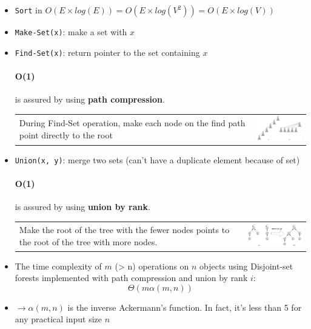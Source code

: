\begin{itemize}
    \item \texttt{Sort} in $O(E \times log(E)) = O(E \times log(V^2)) = O(E \times log(V))$
    \item \texttt{Make-Set(x)}: make a set with $x$
    \item \texttt{Find-Set(x)}: return pointer to the set containing $x$

        \paragraph{O(1)} is assured by using \textbf{path compression}.

        \begin{tabular}{m{11cm}m{3cm}}
            During Find-Set operation, make each node
            on the find path point directly to the root
            &
            \includegraphics[width=3cm]{img/compression}
    \end{tabular}


    \item \texttt{Union(x, y)}: merge two sets (can't have a duplicate element
        because of set)

        \paragraph{O(1)} is assured by using \textbf{union by rank}.

        \begin{tabular}{m{11cm}m{3cm}}
            Make the root of the tree with the fewer nodes points to
            the root of the tree with more nodes.
            &
            \includegraphics[width=4cm]{img/union}
    \end{tabular}
\end{itemize}

\begin{itemize}
    \item The time complexity of $m$ (> n) operations on $n$ objects
        using Disjoint-set forests implemented with path
        compression and union by rank $i$: 
        $$\Theta(m \alpha(m,n))$$
    \item $\rightarrow \alpha(m, n)$ is the inverse Ackermann's function. 
        In fact, it's less than 5 for any practical input size $n$
\end{itemize}

